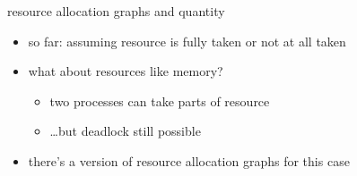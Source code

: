 \begin{frame}{resource allocation graphs and quantity}
    \begin{itemize}
    \item so far: assuming resource is fully taken or not at all taken
    \item what about resources like memory?
        \begin{itemize}
        \item two processes can take parts of resource
        \item \ldots but deadlock still possible
        \end{itemize}
    \item there's a version of resource allocation graphs for this case
    \end{itemize}
\end{frame}
